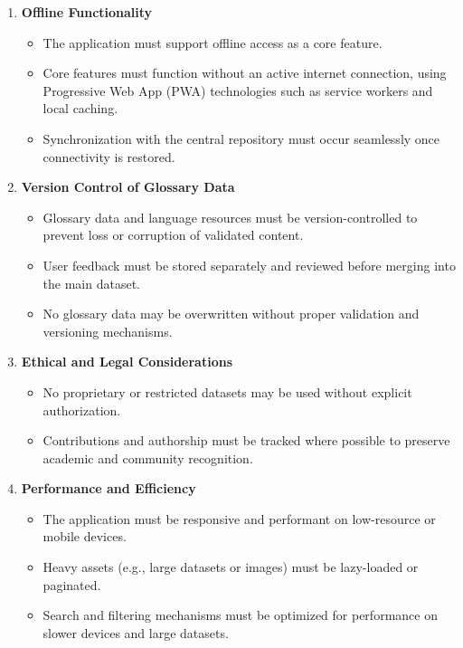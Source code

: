 \documentclass[12pt]{article}
\begin{document}
\begin{enumerate}[label=2.\arabic*, leftmargin=2.5em]
    \item \textbf{Offline Functionality}
    \begin{itemize}
        \item The application must support offline access as a core feature.
        \item Core features must function without an active internet connection, using Progressive Web App (PWA) technologies such as service workers and local caching.
        \item Synchronization with the central repository must occur seamlessly once connectivity is restored.
    \end{itemize}

    \item \textbf{Version Control of Glossary Data}
    \begin{itemize}
        \item Glossary data and language resources must be version-controlled to prevent loss or corruption of validated content.
        \item User feedback must be stored separately and reviewed before merging into the main dataset.
        \item No glossary data may be overwritten without proper validation and versioning mechanisms.
    \end{itemize}

    \item \textbf{Ethical and Legal Considerations}
    \begin{itemize}
        \item No proprietary or restricted datasets may be used without explicit authorization.
        \item Contributions and authorship must be tracked where possible to preserve academic and community recognition.
    \end{itemize}

    \item \textbf{Performance and Efficiency}
    \begin{itemize}
        \item The application must be responsive and performant on low-resource or mobile devices.
        \item Heavy assets (e.g., large datasets or images) must be lazy-loaded or paginated.
        \item Search and filtering mechanisms must be optimized for performance on slower devices and large datasets.
    \end{itemize}


\end{enumerate}
\end{document}
